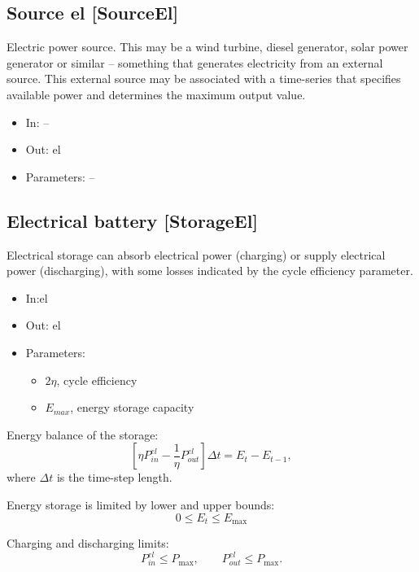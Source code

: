 \documentclass[12pt]{article}
\begin{document}
\subsection{Source el [SourceEl]}

Electric power source. This may be a wind turbine, diesel generator, solar power generator or similar – something that generates electricity from an external source. 
This external source may be associated with a time-series that specifies available power and determines the maximum output value.

\begin{itemize}
\item In: --
\item Out: el
\item Parameters: --
\end{itemize}


\subsection{Electrical battery [StorageEl]}
Electrical storage can absorb electrical power (charging) or supply electrical power (discharging), with some losses indicated by the cycle efficiency parameter.

\begin{itemize}
\item In:el
\item Out: el
\item Parameters:
\begin{itemize}[noitemsep,topsep=0pt]
	\item $2\eta$,  cycle efficiency
	\item $E_{max}$,  energy storage capacity
\end{itemize}
\end{itemize}

\medskip\noindent
Energy balance of the storage:
\begin{equation}
	 \left[  \eta P_{in}^{el}-\frac{1}{ \eta }P_{out}^{el} \right]  \Delta t=E_{t}-E_{t-1}, 
\end{equation}
where  $\Delta t$  is the time-step length.


Energy storage is limited by lower and upper bounds:
 \begin{equation}
 0 \leq E_{t} \leq E_{\max } 
 \end{equation}
 
Charging and discharging limits:
 \begin{equation}
 P_{in}^{el} \leq P_{\max } , \qquad
 P_{out}^{el} \leq P_{\max } .
 \end{equation}
\end{document}
